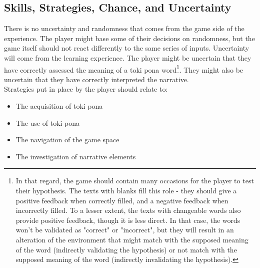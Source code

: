 \documentclass{scrartcl}
\begin{document}
		\subsection{Skills, Strategies, Chance, and Uncertainty}
			There is no uncertainty and randomness that comes from the game side of the experience. The player might base some of their decisions on randomness, but the game itself should not react differently to the same series of inputs. Uncertainty will come from the learning experience. The player might be uncertain that they have correctly assessed the meaning of a toki pona word\footnote{In that regard, the game should contain many occasions for the player to test their hypothesis. The texts with blanks  fill this role - they should give a positive feedback when correctly filled, and a negative feedback when incorrectly filled. To a lesser extent, the texts with changeable words also provide positive feedback, though it is less direct. In that case, the words won't be validated as "correct" or "incorrect", but they will result in an alteration of the environment that might match with the supposed meaning of the word (indirectly validating the hypothesis) or not match with the supposed meaning of the word (indirectly invalidating the hypothesis).}. They might also be uncertain that they have correctly interpreted the narrative. \\ 
			Strategies put in place by the player should relate to:
			\begin{itemize}
				\item The acquisition of toki pona
				\item The use of toki pona
				\item The navigation of the game space
				\item The investigation of narrative elements
			\end{itemize}		
\end{document}
